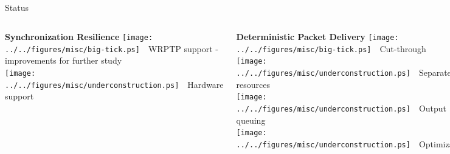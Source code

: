 \documentclass[compress,red]{beamer}
\begin{document}
\subsection{}
\begin{frame}{Status}


\begin{columns}[c]

    \begin{block}{{\bf Synchronization Resilience}}
      \texttt{[image: ../../figures/misc/big-tick.ps]}~~WRPTP support - improvements for further study \\
      \texttt{[image: ../../figures/misc/underconstruction.ps]}~~Hardware support
    \end{block}

    \begin{block}{{\bf Deterministic Packet Delivery}}
      \texttt{[image: ../../figures/misc/big-tick.ps]}~~Cut-through \\
      \texttt{[image: ../../figures/misc/underconstruction.ps]}~~Separate resources \\
      \texttt{[image: ../../figures/misc/underconstruction.ps]}~~Output queuing \\
      \texttt{[image: ../../figures/misc/underconstruction.ps]}~~Optimization
    \end{block}

    \begin{block}{{\bf Data Resilience}}

      \texttt{[image: ../../figures/misc/big-tick.ps]}~~FEC Encoder - more work \\
      \texttt{[image: ../../figures/misc/underconstruction.ps]}~~FEC Decoder

    \end{block}

    \begin{block}{ {\bf Topology redundancy}}
      \texttt{[image: ../../figures/misc/big-tick.ps]}~~Extensive study \\
      \texttt{[image: ../../figures/misc/underconstruction.ps]}~~Hardware/software
    \end{block}


\end{columns}
\end{frame}
\end{document}
